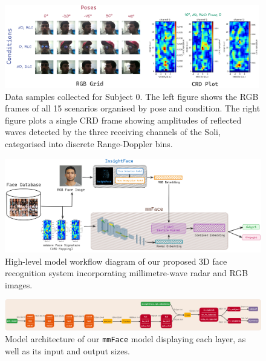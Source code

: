 \documentclass{mpaper}
\begin{document}
\begin{figure}[h!]
    \centering
    \vspace{-0.3cm}
    \includegraphics[width=0.99\textwidth]{figures/rgb_crd_plot.png}
    \vspace{0.2cm}
    \caption{Data samples collected for Subject 0. The left figure shows the RGB frames of all 15 scenarios organised by pose and condition. The right figure plots a single CRD frame showing amplitudes of reflected waves detected by the three receiving channels of the Soli, categorised into discrete Range-Doppler bins.}
    \label{fig:rgb_crd_plot}
    \vspace{0.3cm}
\end{figure}

\begin{figure}[t]
    \centering
    \includegraphics[width=1\textwidth]{figures/model_workflow.png}
    \vspace{0.001cm}
    \caption{High-level model workflow diagram of our proposed 3D face recognition system incorporating millimetre-wave radar and RGB images.}
    \label{fig:model_workflow}
    \vspace{0.3cm}
\end{figure}

\begin{figure}[h!]
    \centering
    \includegraphics[width=1.02\textwidth]{figures/model_architecture.png}
    \vspace{0.001cm}
    \caption{Model architecture of our \texttt{mmFace} model displaying each layer, as well as its input and output sizes.}
    \label{fig:model_architecture}
\end{figure}
\end{document}
